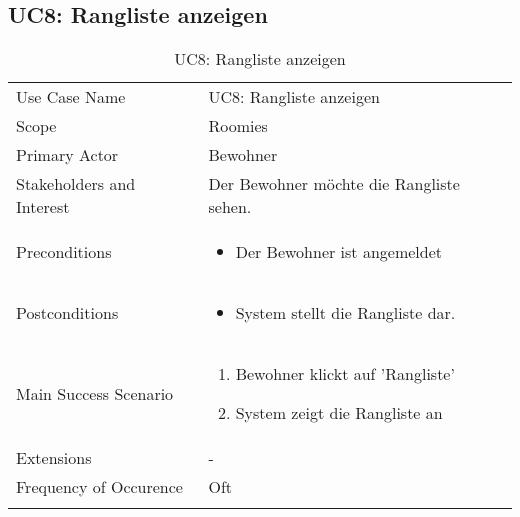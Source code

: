\subsection{UC8: Rangliste anzeigen}
\begin{table}[H]
	\tablestyle
	\tablealtcolored
	\begin{tabularx}{\textwidth}{lX}
		\tablebody
			Use Case Name &
			UC8: Rangliste anzeigen
			\tabularnewline
			Scope &
			Roomies
			\tabularnewline
			Primary Actor &
			Bewohner
			\tabularnewline
			Stakeholders and Interest &
			Der Bewohner möchte die Rangliste sehen.
			\tabularnewline
			Preconditions &
			\begin{itemize}
				\item Der Bewohner ist angemeldet
			\end{itemize}
			\tabularnewline
			Postconditions &
			\begin{itemize}
				\item System stellt die Rangliste dar.
			\end{itemize}
			\tabularnewline
			Main Success Scenario &
			\begin{enumerate}
				\item Bewohner klickt auf 'Rangliste'
				\item System zeigt die Rangliste an
			\end{enumerate}
			\tabularnewline
			Extensions &
			-
			\tabularnewline
			Frequency of Occurence &
			Oft
			\tabularnewline
		\tableend
	\end{tabularx}
	\caption{UC8: Rangliste anzeigen}
\end{table}



